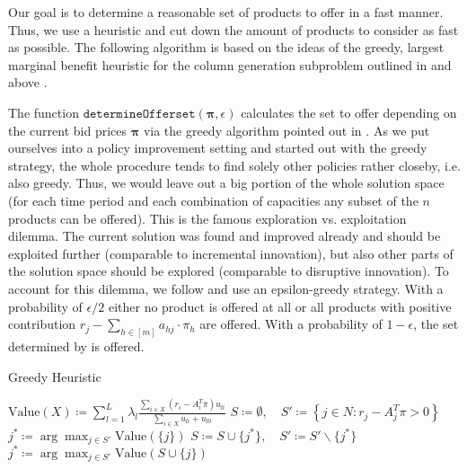Our goal is to determine a reasonable set of products to offer in a fast manner. Thus, we use a heuristic and cut down the amount of products to consider as fast as possible. The following algorithm is based on the ideas of the greedy, largest marginal benefit heuristic for the column generation subproblem outlined in \cite{Bront.2009} and above .

The function $\texttt{determineOfferset}(\boldsymbol{\pi}, \epsilon)$ calculates the set to offer depending on the current bid prices $\boldsymbol{\pi}$ via the greedy algorithm pointed out in \cite{Bront.2009}. As we put ourselves into a policy improvement setting and started out with the greedy strategy, the whole procedure tends to find solely other policies rather closeby, i.e. also greedy. Thus, we would leave out a big portion of the whole solution space (for each time period and each combination of capacities any subset of the $n$ products can be offered). This is the famous exploration vs. exploitation dilemma. The current solution was found and improved already and should be exploited further (comparable to incremental innovation), but also other parts of the solution space should be explored (comparable to disruptive innovation). To account for this dilemma, we follow \cite{Koch.2017} and use an epsilon-greedy strategy. With a probability of $\epsilon/2$ either no product is offered at all or all products with positive contribution $r_j - \sum_{h \in [m]} a_{hj} \cdot \pi_h$ are offered. With a probability of $1-\epsilon$, the set determined by  is offered.

\begin{algorithm}
	\caption{Greedy Heuristic}\label{alg-GreedyHeuristic}
	\begin{algorithmic}[1] %
		\State $\text{Value}(X) \coloneqq \sum_{l=1}^{L} \lambda_l \frac{\sum_{i \in X}(r_i - A_i^T\pi)u_{li}}{\sum_{i \in X}u_{li} + u_{l0}}$
		\State $S\coloneqq \emptyset,\quad S' \coloneqq \left\{j \in N : r_j - A_j^T\pi > 0\right\}$ \label{alg-L1}
		\State $j^* \coloneqq \arg\max_{j \in S'} \text{Value}(\{j\})$
		\Repeat
		\State $S \coloneqq S \cup \{j^*\},\quad S' \coloneqq S'\backslash\{j^*\}$
		\State $j^* \coloneqq \arg \max_{j \in S'} \text{Value}(S \cup \{j\})$
	\end{algorithmic}
\end{algorithm}


